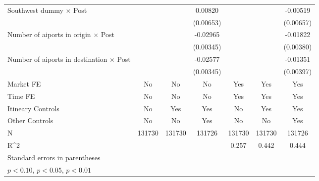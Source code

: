 \begin{table}[htbp]
\begin{tabular}{l*{6}{c}}
\addlinespace
Southwest dummy $\times$ Post&                     &                     &     0.00820         &                     &                     &    -0.00519         \\
                    &                     &                     &   (0.00653)         &                     &                     &   (0.00657)         \\
\addlinespace
Number of aiports in origin $\times$ Post&                     &                     &    -0.02965\sym{***}&                     &                     &    -0.01822\sym{***}\\
                    &                     &                     &   (0.00345)         &                     &                     &   (0.00380)         \\
\addlinespace
Number of aiports in destination $\times$ Post&                     &                     &    -0.02577\sym{***}&                     &                     &    -0.01351\sym{***}\\
                    &                     &                     &   (0.00345)         &                     &                     &   (0.00397)         \\
\midrule
Market FE           &          No         &          No         &          No         &         Yes         &         Yes         &         Yes         \\
Time FE             &          No         &          No         &          No         &         Yes         &         Yes         &         Yes         \\
Itineary Controls   &          No         &         Yes         &         Yes         &          No         &         Yes         &         Yes         \\
Other Controls      &          No         &          No         &         Yes         &          No         &          No         &         Yes         \\
N                   &      131730         &      131730         &      131726         &      131730         &      131730         &      131726         \\
R^2                 &                     &                     &                     &       0.257         &       0.442         &       0.444         \\
\bottomrule
\multicolumn{7}{l}{\footnotesize Standard errors in parentheses}\\
\multicolumn{7}{l}{\footnotesize \sym{*} \(p<0.10\), \sym{**} \(p<0.05\), \sym{***} \(p<0.01\)}\\
\end{tabular}
\end{table}
